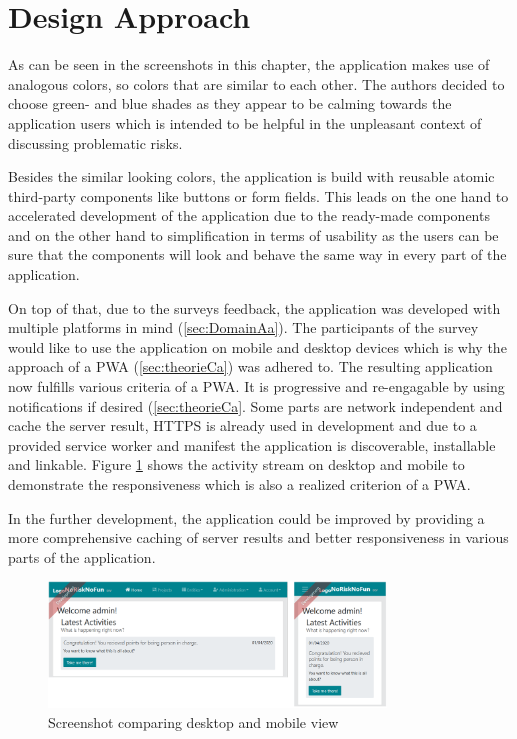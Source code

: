 
\section{Design Approach}
\label{sec:implementationDesign}

As can be seen in the screenshots in this chapter, the application makes use of analogous colors, so colors that are similar to each other. The authors decided to choose green- and blue shades as they appear to be calming towards the application users which is intended to be helpful in the unpleasant context of discussing problematic risks.

Besides the similar looking colors, the application is build with reusable atomic third-party components like buttons or form fields. This leads on the one hand to accelerated development of the application due to the ready-made components and on the other hand to simplification in terms of usability as the users can be sure that the components will look and behave the same way in every part of the application.

On top of that, due to the surveys feedback, the application was developed with multiple platforms in mind (\ref{sec:DomainAa}). The participants of the survey would like to use the application on mobile and desktop devices which is why the approach of a  \acs{PWA} (\ref{sec:theorieCa}) was adhered to. The resulting application now fulfills various criteria of a PWA. It is progressive and re-engagable by using notifications if desired (\ref{sec:theorieCa}. Some parts are network independent and cache the server result, HTTPS is already used in development and due to a provided service worker and manifest the application is discoverable, installable and linkable. Figure \ref{fig:activitystreamcombined} shows the activity stream on desktop and mobile to demonstrate the responsiveness which is also a realized criterion of a  \acs{PWA}.

In the further development, the application could be improved by providing a more comprehensive caching of server results and better responsiveness in various parts of the application.

\begin{figure}[H]
	\centering
	\includegraphics[width=0.8\textwidth]{Assets/implementation_shots/activitystreamcombined.png}
	\caption{Screenshot comparing desktop and mobile view}
	\label{fig:activitystreamcombined}
\end{figure}